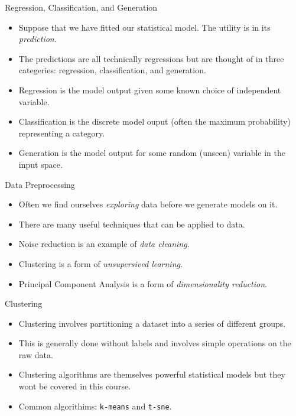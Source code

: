 \documentclass[
  ignorenonframetext,
]{beamer}
\begin{document}
\begin{frame}{Regression, Classification, and Generation}
\protect\hypertarget{regression-classification-and-generation}{}
\begin{itemize}
\item
  Suppose that we have fitted our statistical model. The utility is in
  its \emph{prediction}.
\item
  The predictions are all technically regressions but are thought of in
  three categeries: regression, classification, and generation.
\item
  Regression is the model output given some known choice of independent
  variable.
\item
  Classification is the discrete model ouput (often the maximum
  probability) representing a category.
\item
  Generation is the model output for some random (unseen) variable in
  the input space.
\end{itemize}
\end{frame}

\begin{frame}{Data Preprocessing}
\protect\hypertarget{data-preprocessing}{}
\begin{itemize}
\item
  Often we find ourselves \emph{exploring} data before we generate
  models on it.
\item
  There are many useful techniques that can be applied to data.
\item
  Noise reduction is an example of \emph{data cleaning}.
\item
  Clustering is a form of \emph{unsupersived learning}.
\item
  Principal Component Analysis is a form of \emph{dimensionality
  reduction}.
\end{itemize}
\end{frame}

\begin{frame}[fragile]{Clustering}
\protect\hypertarget{clustering}{}
\begin{itemize}
\item
  Clustering involves partitioning a dataset into a series of different
  groups.
\item
  This is generally done without labels and involves simple operations
  on the raw data.
\item
  Clustering algorithms are themselves powerful statistical models but
  they wont be covered in this course.
\item
  Common algorithims: \texttt{k-means} and \texttt{t-sne}.
\end{itemize}
\end{frame}
\end{document}
